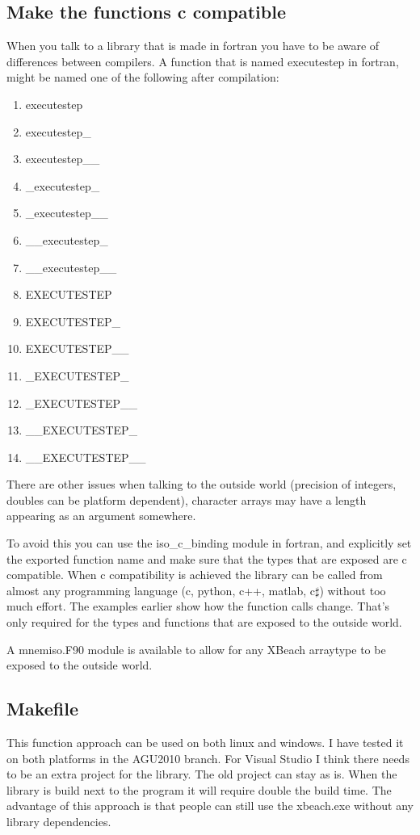 \documentclass{article}
\begin{document}
\subsection{Make the functions c compatible}
When you talk to a library that is made in fortran you have to be aware of differences between compilers. 
A function that is named executestep in fortran, might be named one of the following after compilation:
\begin{enumerate}
\item executestep
\item executestep_
\item executestep__
\item _executestep_
\item _executestep__
\item __executestep_
\item __executestep__
\item EXECUTESTEP
\item EXECUTESTEP_
\item EXECUTESTEP__
\item _EXECUTESTEP_
\item _EXECUTESTEP__
\item __EXECUTESTEP_
\item __EXECUTESTEP__
\end{enumerate}
There are other issues when talking to the outside world (precision of integers, doubles can be platform dependent), character arrays may have a length appearing as an argument somewhere. 

To avoid this you can use the iso_c_binding module in fortran, and explicitly set the exported function name and make sure that the types that are exposed are c compatible. When c compatibility is achieved the library can be called from almost any programming language (c, python, c++, matlab, c$\sharp$) without too much effort. The examples earlier show how the function calls change. That's only required for the types and functions that are exposed to the outside world. 

A mnemiso.F90 module is available to allow for any XBeach arraytype to be exposed to the outside world. 

\subsection{Makefile}
This function approach can be used on both linux and windows. I have tested it on both platforms in the AGU2010 branch. 
For Visual Studio I think there needs to be an extra project for the library. The old project can stay as is. When the library is build next to the program it will require double the build time. The advantage of this approach is that people can still use the xbeach.exe without any library dependencies. 
\end{document}
